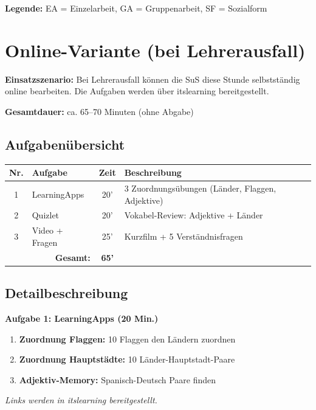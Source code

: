 \documentclass[11pt,a4paper]{article}
\begin{document}
\textbf{Legende:} EA = Einzelarbeit, GA = Gruppenarbeit, SF = Sozialform

\section{Online-Variante (bei Lehrerausfall)}

\begin{onlinebox}
\textbf{Einsatzszenario:} Bei Lehrerausfall können die SuS diese Stunde selbstständig online bearbeiten. Die Aufgaben werden über itslearning bereitgestellt.

\vspace{1em}
\textbf{Gesamtdauer:} ca. 65--70 Minuten (ohne Abgabe)
\end{onlinebox}

\subsection{Aufgabenübersicht}

\begin{tabular}{|c|l|c|p{6cm}|}
\hline
\textbf{Nr.} & \textbf{Aufgabe} & \textbf{Zeit} & \textbf{Beschreibung} \\
\hline
1 & LearningApps & 20' & 3 Zuordnungsübungen (Länder, Flaggen, Adjektive) \\
\hline
2 & Quizlet & 20' & Vokabel-Review: Adjektive + Länder \\
\hline
3 & Video + Fragen & 25' & Kurzfilm + 5 Verständnisfragen \\
\hline
\multicolumn{2}{|r|}{\textbf{Gesamt:}} & \textbf{65'} & \\
\hline
\end{tabular}

\subsection{Detailbeschreibung}

\textbf{Aufgabe 1: LearningApps (20 Min.)}
\begin{enumerate}
    \item \textbf{Zuordnung Flaggen:} 10 Flaggen den Ländern zuordnen
    \item \textbf{Zuordnung Hauptstädte:} 10 Länder-Hauptstadt-Paare
    \item \textbf{Adjektiv-Memory:} Spanisch-Deutsch Paare finden
\end{enumerate}
\textit{Links werden in itslearning bereitgestellt.}
\end{document}
